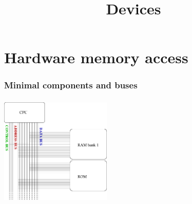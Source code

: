 %
%
%
%
%
%

%
%


%
%

\def\path{../../../..}

%
%



%
%

\title{Devices}

%
%



%
%

\begin{frame}
  \titlepage
\end{frame}

%
%

\begin{frame}
        \tableofcontents
\end{frame}

\section{Hardware memory access}
\begin{frame}
  \frametitle{Minimal components and buses}
  \begin{center}
    \includegraphics[width=150pt,height=150pt]{pic/arch-basic}
  \end{center}
\end{frame}


